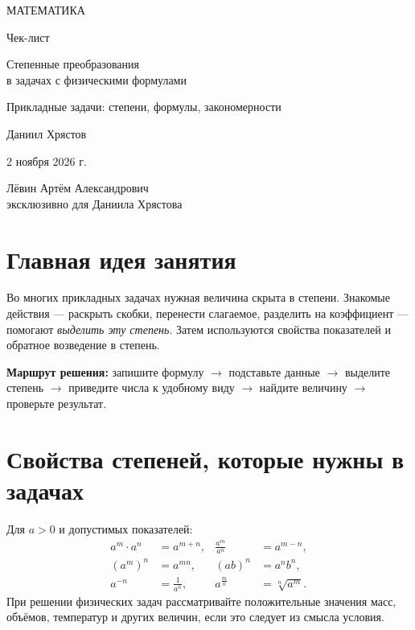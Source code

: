\documentclass[a4paper,12pt]{article}
\newcommand{\sect}[1]{\section{#1}\vspace{-0.35em}\noindent{\color{accent}\rule{\linewidth}{0.45pt}}\vspace{0.25em}}
\newcommand{\key}[1]{{\color{darkaccent}\textbf{#1}}}
\begin{document}
\begin{titlepage}
\thispagestyle{empty}
\begin{center}
\vspace*{28mm}
{\large\color{darkaccent} МАТЕМАТИКА}\par
\vspace{25mm}
{\Huge Чек-лист}\par
\vspace{17mm}
{\LARGE\color{accent} Степенные преобразования\\[3pt] в задачах с физическими формулами}\par
\vspace{18mm}
{\large Прикладные задачи: степени, формулы, закономерности}\par
\vfill
{\Large Даниил Хрястов}\par
\vspace{12mm}
{\large 2 ноября 2026 г.}\par
\vspace{22mm}
{\normalsize Лёвин Артём Александрович\\[3pt] эксклюзивно для Даниила Хрястова}\par
\vspace{21mm}
\end{center}
\end{titlepage}

\sect{Главная идея занятия}
Во многих прикладных задачах нужная величина скрыта в степени. Знакомые действия --- раскрыть скобки, перенести слагаемое, разделить на коэффициент --- помогают \emph{выделить эту степень}. Затем используются свойства показателей и обратное возведение в степень.

\key{Маршрут решения:} запишите формулу $\longrightarrow$ подставьте данные $\longrightarrow$ выделите степень $\longrightarrow$ приведите числа к удобному виду $\longrightarrow$ найдите величину $\longrightarrow$ проверьте результат.

\sect{Свойства степеней, которые нужны в задачах}
Для $a>0$ и допустимых показателей:
\[
\begin{aligned}
a^m\cdot a^n&=a^{m+n}, &\frac{a^m}{a^n}&=a^{m-n},\\[2pt]
(a^m)^n&=a^{mn}, &(ab)^n&=a^n b^n,\\[2pt]
a^{-n}&=\frac1{a^n}, &a^{\frac mn}&=\sqrt[n]{a^m}.
\end{aligned}
\]
При решении физических задач рассматривайте положительные значения масс, объёмов, температур и других величин, если это следует из смысла условия.
\end{document}
